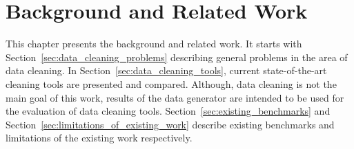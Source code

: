 
\chapter{Background and Related Work} 
\label{sec:background}

This chapter presents the background and related work.
It starts with Section~\ref{sec:data_cleaning_problems} describing general problems in the area of data cleaning.
In Section~\ref{sec:data_cleaning_tools}, current state-of-the-art cleaning tools are presented and compared.
Although, data cleaning is not the main goal of this work, 
results of the data generator are intended to be used for the evaluation of data cleaning tools.
Section~\ref{sec:existing_benchmarks} and Section~\ref{sec:limitations_of_existing_work} describe existing benchmarks and limitations of the existing work respectively.





